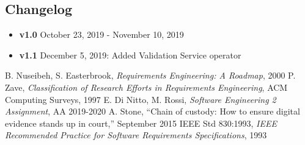 \begin{appendices}
	\section{Changelog}
	\begin{itemize}
		\item \textbf{v1.0} October 23, 2019 - November 10, 2019
		\item \textbf{v1.1} December 5, 2019: Added Validation Service operator
	
	\end{itemize}
\end{appendices}

\clearpage

\begin{thebibliography}{9}

B. Nuseibeh, S. Easterbrook, \emph{Requirements Engineering: A Roadmap}, 2000
P. Zave, \emph{Classification of Research Efforts in Requirements
Engineering}, ACM Computing Surveys, 1997
 E. Di Nitto, M. Rossi, \emph{Software Engineering 2 Assignment}, AA 2019-2020
 A. Stone, “Chain of custody: How to ensure digital evidence stands up in court,” September 2015
IEEE Std 830:1993, \emph{IEEE Recommended Practice for Software Requirements Specifications}, 1993

\end{thebibliography}
